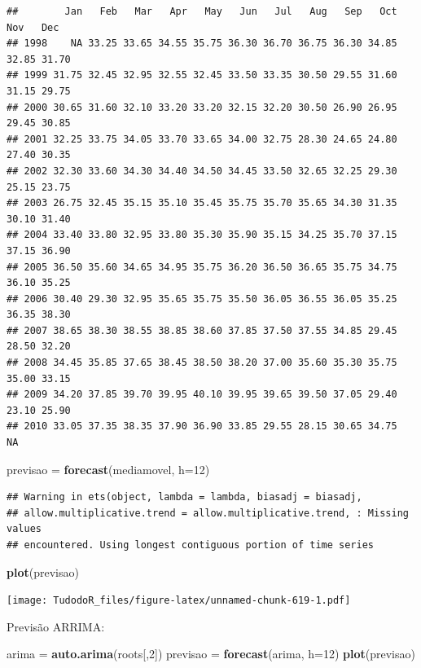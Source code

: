 \documentclass[
]{book}
\newenvironment{Shaded}{\begin{snugshade}}{\end{snugshade}}
\newcommand{\DataTypeTok}[1]{\textcolor[rgb]{0.13,0.29,0.53}{#1}}
\newcommand{\DecValTok}[1]{\textcolor[rgb]{0.00,0.00,0.81}{#1}}
\newcommand{\KeywordTok}[1]{\textcolor[rgb]{0.13,0.29,0.53}{\textbf{#1}}}
\newcommand{\NormalTok}[1]{#1}
\newcommand{\StringTok}[1]{\textcolor[rgb]{0.31,0.60,0.02}{#1}}
\begin{document}
\begin{verbatim}
##        Jan   Feb   Mar   Apr   May   Jun   Jul   Aug   Sep   Oct   Nov   Dec
## 1998    NA 33.25 33.65 34.55 35.75 36.30 36.70 36.75 36.30 34.85 32.85 31.70
## 1999 31.75 32.45 32.95 32.55 32.45 33.50 33.35 30.50 29.55 31.60 31.15 29.75
## 2000 30.65 31.60 32.10 33.20 33.20 32.15 32.20 30.50 26.90 26.95 29.45 30.85
## 2001 32.25 33.75 34.05 33.70 33.65 34.00 32.75 28.30 24.65 24.80 27.40 30.35
## 2002 32.30 33.60 34.30 34.40 34.50 34.45 33.50 32.65 32.25 29.30 25.15 23.75
## 2003 26.75 32.45 35.15 35.10 35.45 35.75 35.70 35.65 34.30 31.35 30.10 31.40
## 2004 33.40 33.80 32.95 33.80 35.30 35.90 35.15 34.25 35.70 37.15 37.15 36.90
## 2005 36.50 35.60 34.65 34.95 35.75 36.20 36.50 36.65 35.75 34.75 36.10 35.25
## 2006 30.40 29.30 32.95 35.65 35.75 35.50 36.05 36.55 36.05 35.25 36.35 38.30
## 2007 38.65 38.30 38.55 38.85 38.60 37.85 37.50 37.55 34.85 29.45 28.50 32.20
## 2008 34.45 35.85 37.65 38.45 38.50 38.20 37.00 35.60 35.30 35.75 35.00 33.15
## 2009 34.20 37.85 39.70 39.95 40.10 39.95 39.65 39.50 37.05 29.40 23.10 25.90
## 2010 33.05 37.35 38.35 37.90 36.90 33.85 29.55 28.15 30.65 34.75    NA
\end{verbatim}

\begin{Shaded}
\begin{Highlighting}[]
\NormalTok{previsao =}\StringTok{ }\KeywordTok{forecast}\NormalTok{(mediamovel, }\DataTypeTok{h=}\DecValTok{12}\NormalTok{)}
\end{Highlighting}
\end{Shaded}

\begin{verbatim}
## Warning in ets(object, lambda = lambda, biasadj = biasadj,
## allow.multiplicative.trend = allow.multiplicative.trend, : Missing values
## encountered. Using longest contiguous portion of time series
\end{verbatim}

\begin{Shaded}
\begin{Highlighting}[]
\KeywordTok{plot}\NormalTok{(previsao)}
\end{Highlighting}
\end{Shaded}

\texttt{[image: TudodoR\_files/figure-latex/unnamed-chunk-619-1.pdf]}

Previsão ARRIMA:

\begin{Shaded}
\begin{Highlighting}[]
\NormalTok{arima =}\StringTok{ }\KeywordTok{auto.arima}\NormalTok{(roots[,}\DecValTok{2}\NormalTok{])}
\NormalTok{previsao =}\StringTok{ }\KeywordTok{forecast}\NormalTok{(arima, }\DataTypeTok{h=}\DecValTok{12}\NormalTok{)}
\KeywordTok{plot}\NormalTok{(previsao)}
\end{Highlighting}
\end{Shaded}
\end{document}
